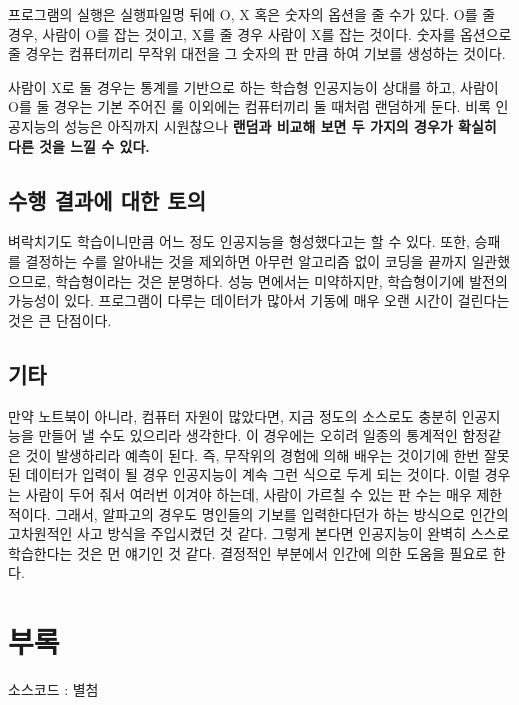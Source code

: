 \documentclass[12pt,a4paper]{report}
\begin{document}
프로그램의 실행은 실행파일명 뒤에 O, X 혹은 숫자의 옵션을 줄 수가 있다.
O를 줄 경우, 사람이 O를 잡는 것이고, X를 줄 경우 사람이 X를 잡는 것이다.
숫자를 옵션으로 줄 경우는 컴퓨터끼리 무작위 대전을 그 숫자의 판 만큼 하여 기보를 생성하는 것이다.

사람이 X로 둘 경우는 통계를 기반으로 하는 학습형 인공지능이 상대를 하고, 사람이 O를 둘 경우는 기본 주어진 룰 이외에는 컴퓨터끼리 둘 때처럼 랜덤하게 둔다.
비록 인공지능의 성능은 아직까지 시원찮으나 \textbf{랜덤과 비교해 보면 두 가지의 경우가 확실히 다른 것을 느낄 수 있다.}


\section{수행 결과에 대한 토의}
벼락치기도 학습이니만큼 어느 정도 인공지능을 형성했다고는 할 수 있다.
또한, 승패를 결정하는 수를 알아내는 것을 제외하면 아무런 알고리즘 없이 코딩을 끝까지 일관했으므로, 학습형이라는 것은 분명하다. 
성능 면에서는 미약하지만, 학습형이기에 발전의 가능성이 있다.
프로그램이 다루는 데이터가 많아서 기동에 매우 오랜 시간이 걸린다는 것은 큰 단점이다.


\section{기타}
만약 노트북이 아니라, 컴퓨터 자원이 많았다면, 지금 정도의 소스로도 충분히 인공지능을 만들어 낼 수도 있으리라 생각한다.
이 경우에는 오히려 일종의 통계적인 함정같은 것이 발생하리라 예측이 된다.
즉, 무작위의 경험에 의해 배우는 것이기에 한번 잘못된 데이터가 입력이 될 경우 인공지능이 계속 그런 식으로 두게 되는 것이다.
이럴 경우는 사람이 두어 줘서 여러번 이겨야 하는데, 사람이 가르칠 수 있는 판 수는 매우 제한적이다. 
그래서, 알파고의 경우도 명인들의 기보를 입력한다던가 하는 방식으로 인간의 고차원적인 사고 방식을 주입시켰던 것 같다. 
그렇게 본다면 인공지능이 완벽히 스스로 학습한다는 것은 먼 얘기인 것 같다.
결정적인 부분에서 인간에 의한 도움을 필요로 한다.

\chapter{부록}
소스코드 : 별첨
\end{document}
